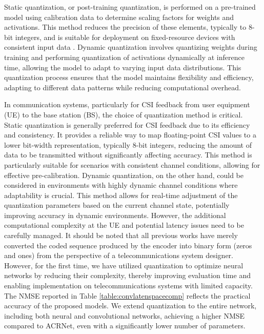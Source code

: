 \documentclass[lettersize,journal]{IEEEtran}
\begin{document}
Static quantization, or post-training quantization, is performed on a pre-trained model using calibration data to determine scaling factors for weights and activations. This method reduces the precision of these elements, typically to 8-bit integers, and is suitable for deployment on fixed-resource devices with consistent input data \cite{staticquantization}.
Dynamic quantization involves quantizing weights during training and performing quantization of activations dynamically at inference time, allowing the model to adapt to varying input data distributions. This quantization process ensures that the model maintains flexibility and efficiency, adapting to different data patterns while reducing computational overhead. \cite{dynamicquantization}

In communication systems, particularly for CSI feedback from user equipment (UE) to the base station (BS), the choice of quantization method is critical. Static quantization is generally preferred for CSI feedback due to its efficiency and consistency. It provides a reliable way to map floating-point CSI values to a lower bit-width representation, typically 8-bit integers, reducing the amount of data to be transmitted without significantly affecting accuracy. This method is particularly suitable for scenarios with consistent channel conditions, allowing for effective pre-calibration.
Dynamic quantization, on the other hand, could be considered in environments with highly dynamic channel conditions where adaptability is crucial. This method allows for real-time adjustment of the quantization parameters based on the current channel state, potentially improving accuracy in dynamic environments. However, the additional computational complexity at the UE and potential latency issues need to be carefully managed.
It should be noted that all previous works have merely converted the coded sequence produced by the encoder into binary form (zeros and ones) from the perspective of a telecommunications system designer. However, for the first time, we have utilized quantization to optimize neural networks by reducing their complexity, thereby improving evaluation time and enabling implementation on telecommunications systems with limited capacity.
The NMSE reported in Table \ref{table:convlatenspacecomp} reflects the practical accuracy of the proposed models. We extend quantization to the entire network, including both neural and convolutional networks, achieving a higher NMSE compared to ACRNet, even with a significantly lower number of parameters.
\end{document}
